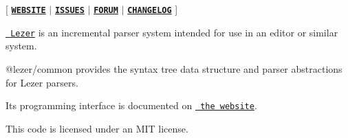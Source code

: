 \mbox{[} \href{http://lezer.codemirror.net}{\texttt{ {\bfseries{W\+E\+B\+S\+I\+TE}}}} $\vert$ \href{https://github.com/lezer-parser/lezer/issues}{\texttt{ {\bfseries{I\+S\+S\+U\+ES}}}} $\vert$ \href{https://discuss.codemirror.net/c/lezer}{\texttt{ {\bfseries{F\+O\+R\+UM}}}} $\vert$ \href{https://github.com/lezer-parser/common/blob/master/CHANGELOG.md}{\texttt{ {\bfseries{C\+H\+A\+N\+G\+E\+L\+OG}}}} \mbox{]}

\href{https://lezer.codemirror.net/}{\texttt{ Lezer}} is an incremental parser system intended for use in an editor or similar system.

@lezer/common provides the syntax tree data structure and parser abstractions for Lezer parsers.

Its programming interface is documented on \href{https://lezer.codemirror.net/docs/ref/\#common}{\texttt{ the website}}.

This code is licensed under an M\+IT license. 